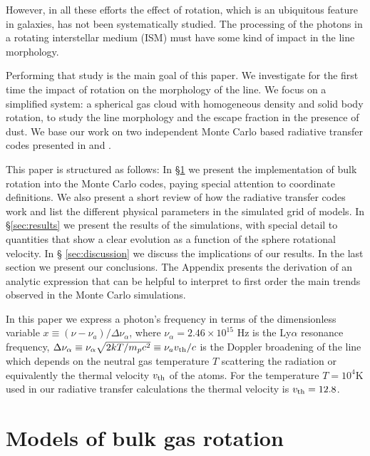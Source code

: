 \documentclass{emulateapj}
\newcommand{\ly}{{\ifmmode{{\rm Ly}\alpha~}\else{Ly$\alpha$~}\fi}}
\newcommand{\kms}{{\ifmmode{{\mathrm{\,km\ s}^{-1}}}\else{\,km~s$^{-1}$}\fi}}
\begin{document}
However, in all these efforts the effect of rotation,
which is an ubiquitous feature in galaxies, has not been
systematically studied. The processing of the \ly photons in a
rotating interstellar medium (ISM) must have some kind of impact in
the \ly line morphology. 

Performing that study is the main goal of this paper. We investigate for the
first time the impact of rotation on the morphology of the \ly
line. We focus on a simplified system: a spherical gas cloud with
homogeneous density and solid body rotation, to study the line
morphology and the escape fraction in the presence of dust. We base
our work on two independent Monte Carlo based radiative transfer codes
presented in \cite{CLARA} and \cite{DijkstraKramer}.   
  
This paper is structured as follows: In \S \ref{sec:implementation} we
present the implementation of bulk rotation into the Monte Carlo
codes, paying special attention to coordinate definitions. We also
present a short review of how the \ly radiative transfer codes work
and list the different physical parameters in the simulated grid of
models. In \S \ref{sec:results} we present the results of the
simulations, with special detail to quantities that show a
clear evolution as a function of the sphere rotational velocity. In \S
\ref{sec:discussion} we discuss the implications of our results. In
the last section we present our conclusions. The Appendix presents the
derivation of an analytic expression that can be helpful to interpret
to first order the main trends observed in the Monte Carlo simulations.


In this paper we express a photon's frequency in terms of the
dimensionless variable $x\equiv (\nu -\nu_a)/\Delta\nu_\alpha$, where
$\nu_{\alpha}=2.46\times 10^{15}$ Hz is the Ly$\alpha$ resonance
frequency,  $\Delta\nu_{\alpha} \equiv
\nu_{\alpha}\sqrt{2kT/m_pc^2}\equiv \nu_av_{\rm th}/c $ is the Doppler
broadening of the line which depends on the neutral gas temperature
$T$ scattering the radiation or equivalently the thermal velocity
$v_{\rm th}$ of the atoms.  For the temperature $T=10^4$K used in our
radiative transfer calculations the thermal velocity is
$v_{\rm th}=12.8$\kms.  




\section{Models of bulk gas rotation}
\label{sec:implementation}
\end{document}
